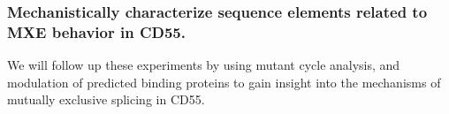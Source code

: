 \documentclass{article}
\begin{document}
\subsubsection{Mechanistically characterize sequence elements related to MXE behavior in CD55.} 
We will follow up these experiments by using mutant cycle analysis, and modulation of predicted binding proteins to gain insight into the mechanisms of mutually exclusive splicing in CD55.




\printbibliography
\end{document}
